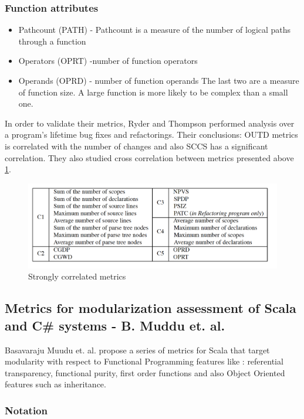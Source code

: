 \documentclass{article}
\begin{document}
\subsubsection{Function attributes}
\begin{itemize}
\item Pathcount (PATH) - Pathcount is a measure of the number of logical paths through a function
\item Operators (OPRT) -number of function operators
\item Operands (OPRD) - number of function operands \newline 
The last two are a measure of function size. A large function is more likely to be complex than a small one.
\end{itemize}

In order to validate their metrics, Ryder and Thompson performed analysis over a program's lifetime bug fixes and refactorings. Their conclusions: OUTD metrics is correlated with the number of changes and also SCCS has a significant correlation. They also studied cross correlation between metrics presented above \ref{fig:cross-correlation}.

\begin{figure}[h!]
  \includegraphics[width=\linewidth]{cross-correlation.png}
  \caption{Strongly correlated metrics}
  \label{fig:cross-correlation}
\end{figure}

\subsection{Metrics for modularization assessment of Scala and C\# systems - B. Muddu et. al.}
Basavaraju Muudu et. al. \cite{DBLP:conf/icse/MudduABP13} propose a series of metrics for Scala that target modularity with respect to Functional Programming features like : referential transparency, functional purity, first order functions and also Object Oriented features such as inheritance.


\subsubsection{Notation}
\end{document}

